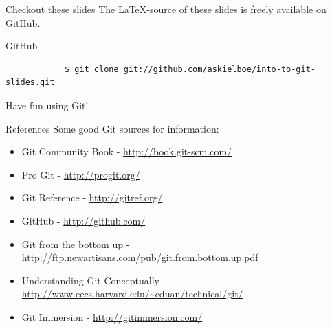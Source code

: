 \documentclass{beamer}
\begin{document}
\begin{frame}[fragile]{Checkout these slides}
	The \LaTeX-source of these slides is freely available on GitHub.
	\begin{exampleblock}{GitHub}
		\begin{footnotesize} \begin{verbatim}
			$ git clone git://github.com/askielboe/into-to-git-slides.git
		\end{verbatim} \end{footnotesize}
	\end{exampleblock}
	\vskip45pt
	\begin{center}
		Have fun using Git!
	\end{center}
\end{frame}

\begin{frame}[fragile]{References}
	Some good Git sources for information:
	\begin{itemize}
		\item Git Community Book - \url{http://book.git-scm.com/}
		\item Pro Git - \url{http://progit.org/}	
		\item Git Reference - \url{http://gitref.org/}
		\item GitHub - \url{http://github.com/}
		\item Git from the bottom up - \url{http://ftp.newartisans.com/pub/git.from.bottom.up.pdf}
		\item Understanding Git Conceptually - \url{http://www.eecs.harvard.edu/~cduan/technical/git/}
		\item Git Immersion - \url{http://gitimmersion.com/}
	\end{itemize}
\end{frame}
\end{document}
